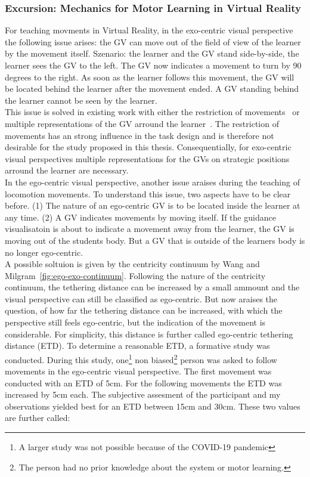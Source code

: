 \subsubsection{Excursion: Mechanics for Motor Learning in Virtual Reality}
For teaching movments in Virtual Reality, in the exo-centric visual perspective the following issue arises: the GV can move out of the field of view of the learner by the movement itself. Szenario: the learner and the GV stand side-by-side, the learner sees the GV to the left. The GV now indicates a movement to turn by 90 degrees to the right. As soon as the learner follows this movement, the GV will be located behind the learner after the movement ended. A GV standing behind the learner cannot be seen by the learner.\\
This issue is solved in existing work with either the restriction of movements~\cite{freethrowsimulator,elearningma} or multiple representations of the GV arround the learner~\cite{thaichichua,mythaichicoaches}. The restriction of movements has an strong influence in the task design and is therefore not desirable for the study proposed in this thesis. Consequentially, for exo-centric visual perspectives multiple representations for the GVs on strategic positions arround the learner are necessary.\\
In the ego-centric visual perspective, another issue araises during the teaching of locomotion movements. To understand this issue, two aspects have to be clear before. (1) The nature of an ego-centric GV is to be located inside the learner at any time. (2) A GV indicates movements by moving itself. If the guidance visualisatoin is about to indicate a movement away from the learner, the GV is moving out of the students body. But a GV that is outside of the learners body is no longer ego-centric.\\
A possible soltuion is given by the centricity continuum by Wang and Milgram~\ref{fig:ego-exo-continuum}. Following the nature of the centricity continuum, the tethering distance can be increased by a small ammount and the visual perspective can still be classified as ego-centric. But now araises the question, of how far the tethering distance can be increased, with which the perspective still feels ego-centric, but the indication of the movement is considerable. For simplicity, this distance is further called ego-centric tethering distance (ETD). To determine a reasonable ETD, a formative study was conducted. During this study, one\footnote{A larger study was not possible because of the COVID-19 pandemic} non biased\footnote{The person had no prior knowledge about the system or motor learning.} person was asked to follow movements in the ego-centric visual perspective. The first movement was conducted with an ETD of 5cm. For the following movements the ETD was increased by 5cm each. The subjective assesment of the participant and my observations yielded best for an ETD between 15cm and 30cm. These two values are further called:
